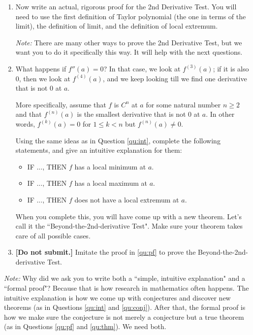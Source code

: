 \documentclass[12pt]{exam}
\begin{document}
\begin{enumerate}
\begin{enumerate}
			\newpage
			
		\item  \label{qu:pf} Now write an actual, rigorous proof for the 2nd Derivative Test.  You will need to use the first definition of Taylor polynomial (the one in terms of the limit), the definition of limit, and the definition of local extremum.
				
			\emph{Note:}  There are many other ways to prove the 2nd Derivative Test, but we want you to do it specifically this way. It will help with the next questions.
	
		\item \label{qu:conj} What happens if $f''(a)=0$?     In that case, we look at $f^{(3)}(a)$;  if it is also $0$, then we look at $f^{(4)}(a)$, and we keep looking till we find one derivative that is not $0$ at $a$.   
		
		More specifically, assume that $f$ is $C^n$ at $a$ for some natural number $n \geq 2$ and that $f^{(n)}(a)$ is the smallest derivative  that is not $0$ at $a$.   In other words, $f^{(k)}(a) =0$ for $ 1 \leq k < n$ but $f^{(n)}(a) \neq 0$.
		
		Using the same ideas as in Question \ref{qu:int}, complete the following statements, and give an intuitive explanation for them:
			\begin{itemize}
				\item  IF ..., THEN $f$ has a local minimum at $a$.
				\item  IF ..., THEN $f$ has a local maximum at $a$.
				\item  IF ..., THEN $f$ does not have a local extremum at $a$.
			\end{itemize}
		When you complete this, you will have come up with a new theorem.  Let's call it the ``Beyond-the-2nd-derivative Test".   Make sure your theorem takes care of all possible cases.  
		\item \label{qu:thm}  {\bf [Do not submit.]}  Imitate the proof in \ref{qu:pf} to prove the Beyond-the-2nd-derivative Test.		
	\end{enumerate}

\emph{Note:}  Why did we ask you to write both a ``simple, intuitive explanation" and a ``formal proof"?  Because that is how research in mathematics often happens.  The intuitive explanation is how we come up with conjectures and discover new theorems (as in Questions \ref{qu:int} and \ref{qu:conj}).   After that, the formal proof is how we make sure the conjecture is not merely a conjecture but a true theorem (as in Questions \ref{qu:pf} and \ref{qu:thm}).   We need both.

\end{enumerate}
\end{document}
